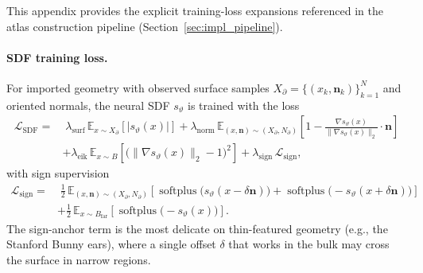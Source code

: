 \documentclass[sort&compress]{svjour3} %
\begin{document}
This appendix provides the explicit training-loss expansions referenced in the atlas construction pipeline (Section~\ref{sec:impl_pipeline}).

\paragraph{SDF training loss.}
For imported geometry with observed surface samples $X_{\partial}=\{(x_k,\mathbf{n}_k)\}_{k=1}^{N}$ and oriented normals, the neural SDF $s_\vartheta$ is trained with the loss
\begin{align}
\mathcal{L}_{\mathrm{SDF}}
=&\;
\lambda_{\mathrm{surf}}\,
\mathbb{E}_{x\sim X_{\partial}}\!\left[|s_{\vartheta}(x)|\right]
+
\lambda_{\mathrm{norm}}\,
\mathbb{E}_{(x,\mathbf{n})\sim (X_{\partial},N_{\partial})}
\left[
1-\frac{\nabla s_{\vartheta}(x)}{\|\nabla s_{\vartheta}(x)\|_2}\cdot \mathbf{n}
\right]
\nonumber\\
&+
\lambda_{\mathrm{eik}}\,
\mathbb{E}_{x\sim B}
\left[
\big(\|\nabla s_{\vartheta}(x)\|_2-1\big)^2
\right]
+
\lambda_{\mathrm{sign}}\,
\mathcal{L}_{\mathrm{sign}},
\label{eq:impl_sdf_loss}
\end{align}
with sign supervision
\begin{align}
\mathcal{L}_{\mathrm{sign}}
=&\;
\tfrac12\,
\mathbb{E}_{(x,\mathbf{n})\sim (X_{\partial},N_{\partial})}
\left[
\operatorname{softplus}\!\big(s_{\vartheta}(x-\delta \mathbf{n})\big)
+
\operatorname{softplus}\!\big(-s_{\vartheta}(x+\delta \mathbf{n})\big)
\right]
\nonumber\\
&+
\tfrac12\,
\mathbb{E}_{x\sim B_{\mathrm{far}}}
\left[
\operatorname{softplus}\!\big(-s_{\vartheta}(x)\big)
\right].
\label{eq:impl_sdf_sign}
\end{align}
The sign-anchor term is the most delicate on thin-featured geometry (e.g., the Stanford Bunny ears), where a single offset $\delta$ that works in the bulk may cross the surface in narrow regions.
\end{document}
